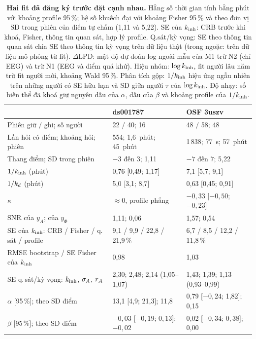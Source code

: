 \begin{table}[t]
\caption{\textbf{Hai fit đã đăng ký trước đặt cạnh nhau.} Hằng số thời gian tính bằng phút với khoảng profile 95\,\%; hệ số khuếch đại với khoảng Fisher 95\,\% và theo đơn vị SD trong phiên của điểm tự chấm (1,11 và 5,22). SE của $k_{\mathrm{inh}}$: CRB trước khi khoá, Fisher, thông tin quan sát, hợp lý profile. Q.sát/kỳ vọng: SE theo thông tin quan sát chia SE theo thông tin kỳ vọng trên dữ liệu thật (trong ngoặc: trên dữ liệu mô phỏng từ fit). \mbox{$\Delta$}LPD: mật độ dự đoán log ngoài mẫu của M1 trừ N2 (chỉ EEG) và trừ N1 (EEG và điểm quá khứ). Hiệu nhóm: $\log k_{\mathrm{inh}}$, fit người lâu năm trừ fit người mới, khoảng Wald 95\,\%. Phân tích gộp: $1/k_{\mathrm{inh}}$ hiệu ứng ngẫu nhiên trên những người có SE hữu hạn và SD giữa người $\tau$ của $\log k_{\mathrm{inh}}$. Độ nhạy: số biến thể đã khoá giữ nguyên dấu của $\alpha$, dấu của $\beta$ và khoảng profile của $1/k_{\mathrm{inh}}$.}
\label{tab:compare}
\centering\footnotesize
\setlength{\tabcolsep}{4pt}
\begin{tabular}{lll}
\toprule
 & ds001787 & OSF 3uszv \\
\midrule
Phiên giữ / ghi; số người                & 22 / 40; 16 & 48 / 58; 48 \\
Lần hỏi có điểm; khoảng hỏi; phiên      & 554; 1,6~phút; 45~phút & 1\,838; 77~s; 57~phút \\
Thang điểm; SD trong phiên               & $-3$ đến $3$; 1,11 & $-7$ đến $7$; 5,22 \\
$1/k_{\mathrm{inh}}$ (phút)                         & 0,76 [0,49; 1,17] & 7,1 [5,7; 9,1] \\
$1/k_{d}$ (phút)                           & 5,0 [3,1; 8,7] & 0,63 [0,45; 0,91] \\
$\kappa$                                 & $\approx0$, profile phẳng & $-0{,}33$ [$-0{,}50$; $-0{,}23$] \\
SNR của $y_A$; của $y_\Phi$              & 1,11; 0,06 & 1,57; 0,54 \\
SE của $k_{\mathrm{inh}}$: CRB / Fisher / q.\,sát / profile & 9,1 / 9,9 / 22,8 / 21,9\,\% & 6,7 / 8,5 / 12,2 / 11,8\,\% \\
RMSE bootstrap / SE Fisher của $k_{\mathrm{inh}}$   & 0,98 & 1,03 \\
SE q.\,sát/kỳ vọng: $k_{\mathrm{inh}}$, $\sigma_{A}$, $r_{A}$ & 2,30; 2,48; 2,14 (1,05--1,07) & 1,43; 1,39; 1,13 (0,93--0,99) \\
$\alpha$ [95\,\%]; theo SD điểm          & 13,1 [4,9; 21,3]; 11,8 & 0,79 [$-0{,}24$; 1,82]; 0,15 \\
$\beta$ [95\,\%]; theo SD điểm           & $-0{,}03$ [$-0{,}19$; $0{,}13$]; $-0{,}02$ & 0,02 [$-0{,}34$; $0{,}38$]; 0,00 \\

\end{tabular}
\end{table}
